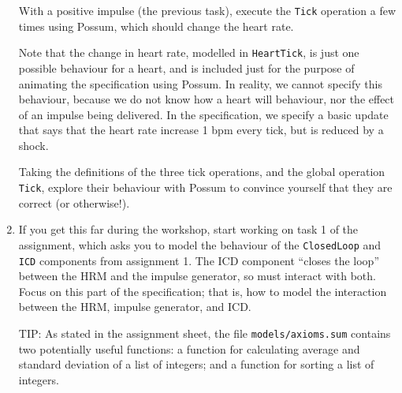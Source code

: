\documentclass{article}
\begin{document}
\begin{enumerate}
 With a positive impulse (the previous task), execute the \texttt{Tick} operation a few times using Possum, which should change the heart rate.

 Note that the change in heart rate, modelled in \texttt{HeartTick}, is just one possible behaviour for a heart, and is included just for the purpose of animating the specification using Possum. In reality, we cannot specify this behaviour, because we do not know how a heart will behaviour, nor the effect of an impulse being delivered. In the specification, we specify a basic update that says that the heart rate increase 1 bpm every tick, but is reduced by a shock.

 Taking the definitions of the three tick operations, and the global operation \texttt{Tick}, explore their behaviour with Possum to convince yourself that they are correct (or otherwise!).

 \item If you get this far during the workshop, start working on task 1 of the assignment, which asks you to model the behaviour of the \texttt{ClosedLoop} and \texttt{ICD} components from assignment 1.  The ICD component ``closes the loop'' between the HRM and the impulse generator, so must interact with both. Focus on this part of the specification; that is, how to model the interaction between the HRM, impulse generator, and ICD.

 TIP: As stated in the assignment sheet, the file \texttt{models/axioms.sum} contains two potentially useful functions: a function for calculating average and standard deviation of a list of integers; and a function for sorting a list of integers.

\end{enumerate}
\end{document}
